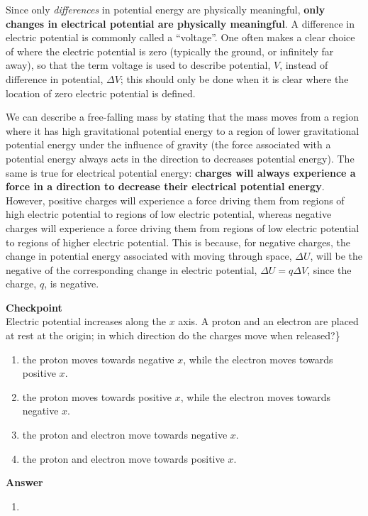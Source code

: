 Since only \textit{differences} in potential energy are physically meaningful, \textbf{only changes in electrical potential are physically meaningful}. A difference in electric potential is commonly called a ``voltage''. One often makes a clear choice of where the electric potential is zero (typically the ground, or infinitely far away), so that the term voltage is used to describe potential, $V$, instead of difference in potential, $\Delta V$; this should only be done when it is clear where the location of zero electric potential is defined.

We can describe a free-falling mass by stating that the mass moves from a region where it has high gravitational potential energy to a region of lower gravitational potential energy under the influence of gravity (the force associated with a potential energy always acts in the direction to decreases potential energy). The same is true for electrical potential energy: \textbf{charges will always experience a force in a direction to decrease their electrical potential energy}. However, positive charges will experience a force driving them from regions of high electric potential to regions of low electric potential, whereas negative charges will experience a force driving them from regions of low electric potential to regions of higher electric potential. This is because, for negative charges, the change in potential energy associated with moving through space, $\Delta U$, will be the negative of the corresponding change in electric potential, $\Delta U=q\Delta V$, since the charge, $q$, is negative.


\begin{framed}
\textbf{Checkpoint}\\
Electric potential increases along the $x$ axis. A proton and an electron are placed at rest at the origin; in which direction do the charges move when released?\}

\begin{enumerate}
\item the proton moves towards negative $x$, while the electron moves towards positive $x$.
\item the proton moves towards positive $x$, while the electron moves towards negative $x$.
\item the proton and electron move towards negative $x$.
\item the proton and electron move towards positive $x$.
\end{enumerate}

\begin{framed}
\textbf{Answer}\\
\begin{enumerate}
\item
\end{enumerate}
\end{framed}
\end{framed}

